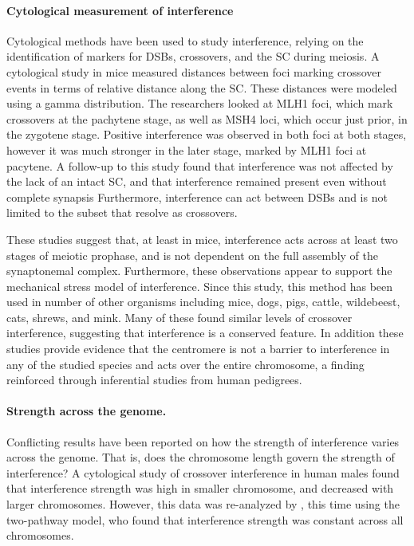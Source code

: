 \paragraph{Cytological measurement of interference}
Cytological methods have been used to study interference, relying on the identification of markers for DSBs, crossovers, and the SC during meiosis.
A cytological study in mice measured distances between foci marking crossover events in terms of relative distance along the SC.
These distances were modeled using a gamma distribution\cite{DeBoer2006a}.
The researchers looked at MLH1 foci, which mark crossovers at the pachytene stage, as well as MSH4 loci, which occur just prior, in the zygotene stage.
Positive interference was observed in both foci at both stages, however it was much stronger in the later stage, marked by MLH1 foci at pacytene.
A follow-up to this study found that interference was not affected by the lack of an intact SC, and that interference remained present even without complete synapsis\cite{DeBoer2007}
Furthermore, interference can act between DSBs and is not limited to the subset that resolve as crossovers\cite{Baudat2007}.

These studies suggest that, at least in mice, interference acts across at least two stages of meiotic prophase, and is not dependent on the full assembly of the synaptonemal complex.
Furthermore, these observations appear to support the mechanical stress model of interference.
Since this study, this method has been used in number of other organisms %
including mice\cite{Barchi2008}, dogs\cite{Basheva2008}, pigs\cite{Mary2014},
cattle\cite{Vozdova2013}, wildebeest\cite{Vozdova2013}, cats\cite{Borodin2008a}, shrews\cite{Borodin2008}, and mink\cite{Borodin2009}.
%
Many of these found similar levels of crossover interference, suggesting that interference is a conserved feature.
In addition these studies provide evidence that the centromere is not a barrier to interference in any of the studied species and acts over the entire chromosome, a finding reinforced through inferential studies from human pedigrees\cite{Broman2000,Fledel-Alon2009}.

\paragraph{Strength across the genome.}
Conflicting results have been reported on how the strength of interference varies across the genome.
That is, does the chromosome length govern the strength of interference?
A cytological study of crossover interference in human males\cite{Lian2008} found that interference strength was high in smaller chromosome, and decreased with larger chromosomes.
However, this data was re-analyzed by \citet{Housworth2009}, this time using the two-pathway model, who found that interference strength was constant across all chromosomes.


